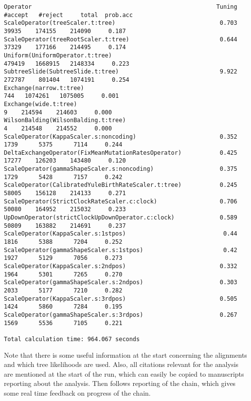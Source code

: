 \documentclass[12pt]{article}
\begin{document}
{\begin{verbatim}
Operator                                                     Tuning   #accept   #reject     total  prob.acc
ScaleOperator(treeScaler.t:tree)                              0.703     39935    174155    214090     0.187 
ScaleOperator(treeRootScaler.t:tree)                          0.644     37329    177166    214495     0.174 
Uniform(UniformOperator.t:tree)                                        479419   1668915   2148334     0.223 
SubtreeSlide(SubtreeSlide.t:tree)                             9.922    272787    801404   1074191     0.254 
Exchange(narrow.t:tree)                                                   744   1074261   1075005     0.001 
Exchange(wide.t:tree)                                                       9    214594    214603     0.000 
WilsonBalding(WilsonBalding.t:tree)                                         4    214548    214552     0.000 
ScaleOperator(KappaScaler.s:noncoding)                        0.352      1739      5375      7114     0.244 
DeltaExchangeOperator(FixMeanMutationRatesOperator)           0.425     17277    126203    143480     0.120 
ScaleOperator(gammaShapeScaler.s:noncoding)                   0.375      1729      5428      7157     0.242 
ScaleOperator(CalibratedYuleBirthRateScaler.t:tree)           0.245     58005    156128    214133     0.271 
ScaleOperator(StrictClockRateScaler.c:clock)                  0.706     50080    164952    215032     0.233 
UpDownOperator(strictClockUpDownOperator.c:clock)             0.589     50809    163882    214691     0.237 
ScaleOperator(KappaScaler.s:1stpos)                            0.44      1816      5388      7204     0.252 
ScaleOperator(gammaShapeScaler.s:1stpos)                       0.42      1927      5129      7056     0.273 
ScaleOperator(KappaScaler.s:2ndpos)                           0.332      1964      5301      7265     0.270 
ScaleOperator(gammaShapeScaler.s:2ndpos)                      0.303      2033      5177      7210     0.282 
ScaleOperator(KappaScaler.s:3rdpos)                           0.505      1424      5860      7284     0.195 
ScaleOperator(gammaShapeScaler.s:3rdpos)                      0.267      1569      5536      7105     0.221 

Total calculation time: 964.067 seconds
\end{verbatim}}

Note that there is some useful information at the start concerning the alignments and which tree likelihoods are used. Also, all citations relevant for the analysis are mentioned at the start of the run, which can easily be copied to
manuscripts reporting about the analysis. Then follows reporting of the chain,
which gives some real time feedback on progress of the chain.
\end{document}
